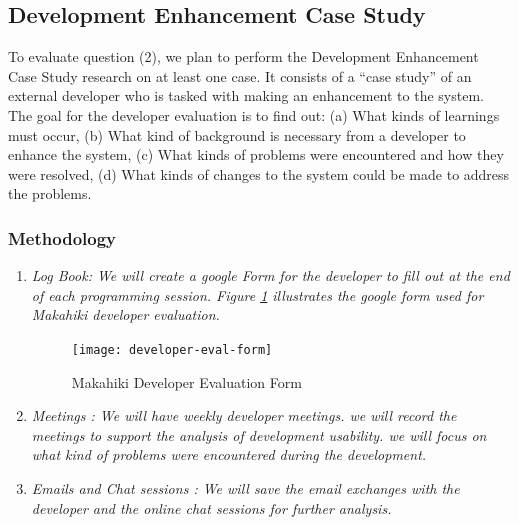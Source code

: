 \documentclass[11pt]{article}
\begin{document}
\subsection{Development Enhancement Case Study}
To evaluate question (2), we plan to perform the Development Enhancement Case Study research on at least one case. It consists of a ``case study'' of an external developer who is tasked with making an enhancement to the system.  The goal for the developer evaluation is to find out: (a) What kinds of learnings must occur, (b) What kind of background is necessary from a developer to enhance the system, (c) What kinds of problems were encountered and how they were resolved, (d) What kinds of changes to the system could be made to address the problems.

\subsubsection{Methodology}
\begin{enumerate}
\item \em Log Book\em: We will create a google Form for the developer to fill out at the end of each programming session. Figure \ref{fig:developer-eval-form} illustrates the google form used for Makahiki developer evaluation.

\begin{figure}[htbp] %
   \centering
   \texttt{[image: developer-eval-form]} 
   \caption{Makahiki Developer Evaluation Form}
   \label{fig:developer-eval-form}
\end{figure}
 
\item \em Meetings \em: We will have weekly developer meetings. we will record the meetings to support the analysis of development usability. we will focus on what kind of problems were encountered during the development.

\item \em Emails and Chat sessions \em: We will save the email exchanges with the developer and the online chat sessions for further analysis.

\end{enumerate}
\end{document}
